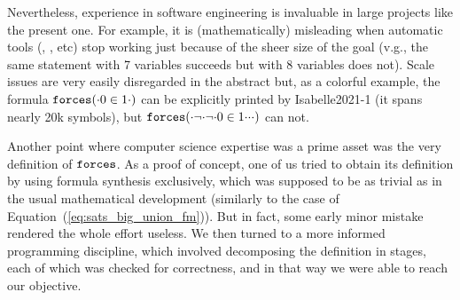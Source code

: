 Nevertheless, experience  in software engineering is invaluable in
large projects like the present one. For example, it is
(mathematically) misleading when automatic tools (,
, etc) stop working just because of the sheer size of the
goal (v.g., the same statement with 7 variables succeeds but with 8
variables does not). Scale issues are very easily disregarded in the
abstract but, as a colorful example, the formula $\mathop{\mathtt{forces}}({\cdot}0\in 1{\cdot})$
can be explicitly printed by Isabelle2021-1 (it spans nearly 20k symbols), but
$\mathop{\mathtt{forces}}({\cdot}\neg{\cdot}\neg{\cdot}0\in 1{\cdot}{\cdot}{\cdot})$
can not.

Another point where computer science expertise was a prime asset was
the very definition of $\mathop{\mathtt{forces}}$. As a
proof of concept, one of us tried to obtain its definition by
using formula synthesis exclusively, which was supposed to be as
trivial as in the usual
mathematical development (similarly to the case of
Equation~(\ref{eq:sats_big_union_fm})).
But in fact, some early minor mistake
rendered the whole effort useless. We then turned to a more
informed programming discipline, which involved decomposing the
definition in stages, each of which was checked for correctness, and
in that way we were able to reach our objective.


